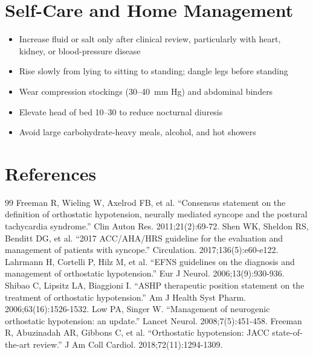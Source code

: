 \section*{Self-Care and Home Management}
\begin{itemize}
  \item Increase fluid or salt only after clinical review, particularly with heart, kidney, or blood-pressure disease
  \item Rise slowly from lying to sitting to standing; dangle legs before standing
  \item Wear compression stockings (30--40~mm Hg) and abdominal binders
  \item Elevate head of bed 10--30\textdegree{} to reduce nocturnal diuresis
  \item Avoid large carbohydrate-heavy meals, alcohol, and hot showers
\end{itemize}

\section*{References}
\begin{thebibliography}{99}
 Freeman R, Wieling W, Axelrod FB, et al. ``Consensus statement on the definition of orthostatic hypotension, neurally mediated syncope and the postural tachycardia syndrome.'' Clin Auton Res. 2011;21(2):69-72.
 Shen WK, Sheldon RS, Benditt DG, et al. ``2017 ACC/AHA/HRS guideline for the evaluation and management of patients with syncope.'' Circulation. 2017;136(5):e60-e122.
 Lahrmann H, Cortelli P, Hilz M, et al. ``EFNS guidelines on the diagnosis and management of orthostatic hypotension.'' Eur J Neurol. 2006;13(9):930-936.
 Shibao C, Lipsitz LA, Biaggioni I. ``ASHP therapeutic position statement on the treatment of orthostatic hypotension.'' Am J Health Syst Pharm. 2006;63(16):1526-1532.
 Low PA, Singer W. ``Management of neurogenic orthostatic hypotension: an update.'' Lancet Neurol. 2008;7(5):451-458.
 Freeman R, Abuzinadah AR, Gibbons C, et al. ``Orthostatic hypotension: JACC state-of-the-art review.'' J Am Coll Cardiol. 2018;72(11):1294-1309.
\end{thebibliography}
